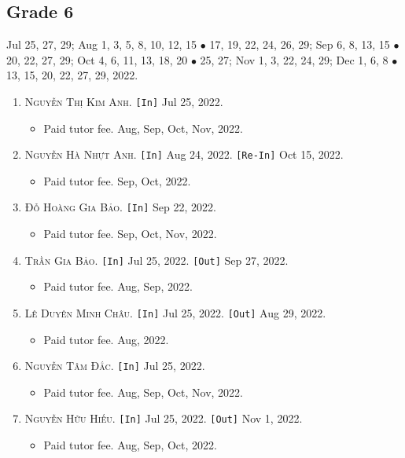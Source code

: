 \documentclass{article}
\numberwithin{equation}{section}
\begin{document}
\subsection{Grade 6}
Jul 25, 27, 29; Aug 1, 3, 5, 8, 10, 12, 15 $\bullet$ 17, 19, 22, 24, 26, 29; Sep 6, 8, 13, 15 $\bullet$ 20, 22, 27, 29; Oct 4, 6, 11, 13, 18, 20 $\bullet$ 25, 27; Nov 1, 3, 22, 24, 29; Dec 1, 6, 8 $\bullet$ 13, 15, 20, 22, 27, 29, 2022.
\begin{enumerate}
	\item \textsc{Nguyễn Thị Kim Anh.} \texttt{[In]} Jul 25, 2022.
	\begin{itemize}
		\item \textsf{Paid tutor fee.} Aug, Sep, Oct, Nov, 2022.
	\end{itemize}
	\item \textsc{Nguyễn Hà Nhựt Anh.} \texttt{[In]} Aug 24, 2022. \texttt{[Re-In]} Oct 15, 2022.
	\begin{itemize}
		\item \textsf{Paid tutor fee.} Sep, Oct, 2022.
	\end{itemize}
	\item \textsc{Đỗ Hoàng Gia Bảo.} \texttt{[In]} Sep 22, 2022.
	\begin{itemize}
		\item \textsf{Paid tutor fee.} Sep, Oct, Nov, 2022.
	\end{itemize}
	\item \textsc{Trần Gia Bảo.} \texttt{[In]} Jul 25, 2022. \texttt{[Out]} Sep 27, 2022.
	\begin{itemize}
		\item \textsf{Paid tutor fee.} Aug, Sep, 2022.
	\end{itemize}
	\item \textsc{Lê Duyên Minh Châu.} \texttt{[In]} Jul 25, 2022. \texttt{[Out]} Aug 29, 2022.
	\begin{itemize}
		\item \textsf{Paid tutor fee.} Aug, 2022.
	\end{itemize}
	\item \textsc{Nguyễn Tâm Đắc.} \texttt{[In]} Jul 25, 2022.
	\begin{itemize}
		\item \textsf{Paid tutor fee.} Aug, Sep, Oct, Nov, 2022.
	\end{itemize}
	\item \textsc{Nguyễn Hữu Hiếu.} \texttt{[In]} Jul 25, 2022. \texttt{[Out]} Nov 1, 2022.
	\begin{itemize}
		\item \textsf{Paid tutor fee.} Aug, Sep, Oct, 2022.

\end{itemize}
\end{enumerate}
\end{document}
